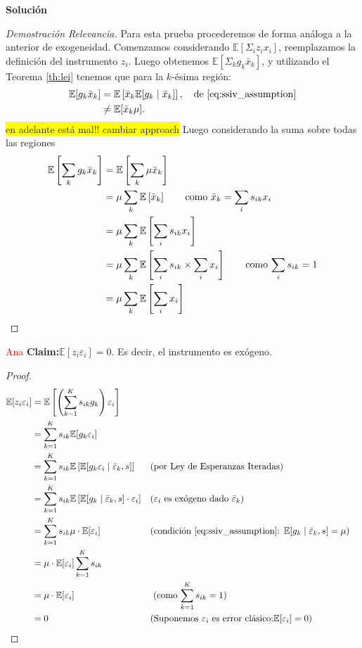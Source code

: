 \documentclass[a4paper, answers, addpoints, 11pt]{exam}
\newenvironment{solucion}{%
  \begin{mdframed}[
    backgroundcolor=blue!5,    %
    linecolor=blue!50,          %
    linewidth=2pt,              %
    leftmargin=10pt,            %
    rightmargin=8pt,           %
    topline=true,              %
    bottomline=true,            %
    roundcorner=10pt,           %
    innerleftmargin=10pt,       %
    innerrightmargin=10pt,      %
    innerbottommargin=10pt,     %
    innertopmargin=10pt         %
  ]%
  \begin{tcolorbox}[colframe=blue!50!black, colback=blue!50, coltitle=white, sharp corners=all, boxrule=1mm, width=\textwidth, halign=left, valign=center, top=0mm, bottom=0mm, left=0mm, right=0mm] \textbf{Solución} \end{tcolorbox} }{\end{mdframed}}
\begin{document}
\begin{enumerate}
\begin{solucion}
    \begin{proof}[Demostración Relevancia]
    Para esta prueba procederemos de forma análoga a la anterior de exogeneidad. Comenzamos considerando $\mathbb{E}[\Sigma_iz_ix_i]$, reemplazamos la definición del instrumento $z_i$. Luego obtenemos $\mathbb{E}[\Sigma_kg_k\bar{x}_k]$, y utilizando el Teorema \ref{th:lei} tenemos que para la $k$-ésima región:
    \begin{align}
        \mathbb{E}[g_k \bar{x}_k] &=
       \mathbb{E}\left[ \bar{x}_k \mathbb{E}[g_k \mid \bar{x}_k] \right], \quad \text{de \ref{eq:ssiv_assumption}} \notag \\
       &\neq \mathbb{E}[\bar{x}_k \mu]. \label{aux_relevancia}
    \end{align}
    \colorbox{yellow}{en adelante está mal!! cambiar approach}
    Luego considerando la suma sobre todas las regiones
    \begin{align}
        \mathbb{E}\left[\sum_k g_k \bar{x}_k\right] &= 
        \mathbb{E}\left[\sum_k \mu \bar{x}_k\right] \notag \\
    &= \mu \sum_k \mathbb{E}\left[ \bar{x}_k\right] \qquad \text{como $\bar{x}_k=\sum_is_{ik}x_i$} \notag \\
    &= \mu \sum_k \mathbb{E}\left[ \sum_is_{ik}x_i\right] \notag \\
    &= \mu \sum_k \mathbb{E}\left[\sum_is_{ik}\times\sum_ix_i\right]  \notag \qquad \text{como $\sum_is_{ik}=1$}  \\
    &= \mu \sum_k \mathbb{E}\left[\sum_ix_i\right]  \notag 
    \end{align}
    
    \end{proof}
    \textcolor{red}{Ana}
    \textbf{Claim:}$\mathbb{E}[z_i \varepsilon_i]=0$. Es decir, el instrumento es exógeno.
    \begin{proof}
\begin{align*}
\mathbb{E}[z_i \varepsilon_i] 
&= \mathbb{E} \left[ \left( \sum_{k=1}^K s_{ik} g_k \right) \varepsilon_i \right]  \\
&= \sum_{k=1}^K s_{ik} \mathbb{E}[g_k \varepsilon_i] \\
&= \sum_{k=1}^K s_{ik} \mathbb{E}\left[ \mathbb{E}[g_k \varepsilon_i \mid \bar{\varepsilon}_k, s] \right] && \text{(por Ley de Esperanzas Iteradas)} \\
&= \sum_{k=1}^K s_{ik} \mathbb{E}\left[ \mathbb{E}[g_k \mid \bar{\varepsilon}_k, s] \cdot \varepsilon_i \right] && \text{($\varepsilon_i$ es exógeno dado $ \bar{\varepsilon}_k$)} \\
&= \sum_{k=1}^K s_{ik} \mu \cdot \mathbb{E}[\varepsilon_i] && \text{(condición \ref{eq:ssiv_assumption}: } \mathbb{E}[g_k \mid \bar{\varepsilon}_k, s] = \mu) \\
&= \mu \cdot \mathbb{E}[\varepsilon_i] \sum_{k=1}^K s_{ik}  \\
&= \mu \cdot \mathbb{E}[\varepsilon_i] && \text{ (como $\sum_{k=1}^K s_{ik} = 1$)} \\
&= 0 && \text{(Suponemos $\varepsilon_i$ es error clásico:} \mathbb{E}[\varepsilon_i] = 0)
\end{align*}
    \end{proof}


\end{solucion}
\end{enumerate}
\end{document}

